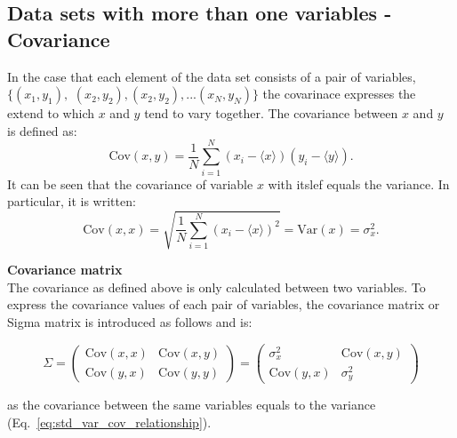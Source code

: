 


\subsection{Data sets with more than one variables - Covariance}
In the case that each element of the data set consists of a pair of variables, $\{(x_1, y_1),$ $(x_2, y_2), (x_2, y_2), ...(x_N, y_N)\}$ the covarinace expresses the extend to which $x$ and $y$ tend to vary together. The covariance between $x$ and $y$ is defined as:
\begin{equation}\label{eq:cov_def}
    \mathrm{Cov}(x, y) = \frac{1}{N} \sum_{i=1}^{N} (x_i-\langle x \rangle) (y_i-\langle y \rangle).
\end{equation}
It can be seen that the covariance of variable $x$ with itslef equals the variance. In particular, it is written:
\begin{equation}\label{eq:std_var_cov_relationship}
    \mathrm{Cov}(x, x) = \sqrt{\frac{1}{N} \sum_{i=1}^{N} (x_i-\langle x \rangle)^2} = \mathrm{Var}(x) = \sigma_x^2.
\end{equation}

\textbf{Covariance matrix}\\
The covariance as defined above is only calculated between two variables. To express the covariance values of each pair of variables, the covariance matrix or Sigma matrix is introduced as follows and is:

\begin{equation}\label{eq:Sigma_matrix}
    \Sigma = \begin{pmatrix}
        \mathrm{Cov}(x,x) & \mathrm{Cov}(x,y) \\ 
        \mathrm{Cov}(y,x) & \mathrm{Cov}(y,y) 
        \end{pmatrix}  = \begin{pmatrix}
            \sigma_x^2 & \mathrm{Cov}(x,y) \\ 
            \mathrm{Cov}(y,x) & \sigma_y^2 
            \end{pmatrix}
\end{equation}

as the covariance between the same variables equals to the variance (Eq.~\eqref{eq:std_var_cov_relationship}).

